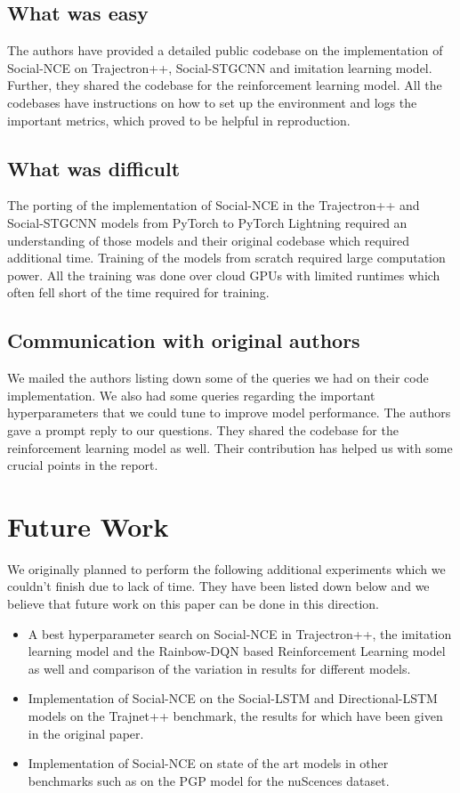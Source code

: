 \subsection{What was easy}
The authors have provided a detailed public codebase on the implementation of Social-NCE on Trajectron++, Social-STGCNN and imitation learning model. Further, they shared the codebase for the reinforcement learning model. All the codebases have instructions on how to set up the environment and logs the important metrics, which proved to be helpful in reproduction. 

\subsection{What was difficult}
The porting of the implementation of Social-NCE in the Trajectron++ and Social-STGCNN models from PyTorch to PyTorch Lightning required an understanding of those models and their original codebase which required additional time. Training of the models from scratch required large computation power. All the training was done over cloud GPUs with limited runtimes which often fell short of the time required for training.

\subsection{Communication with original authors}
We mailed the authors listing down some of the queries we had on their code implementation. We also had some queries regarding the important hyperparameters that we could tune to improve model performance. The authors gave a prompt reply to our questions. They shared the codebase for the reinforcement learning model as well. Their contribution has helped us with some crucial points in the report. 

\section{Future Work}
We originally planned to perform the following additional experiments which we couldn't finish due to lack of time. They have been listed down below and we believe that future work on this paper can be done in this direction.
\begin{itemize}
    \item A best hyperparameter search on Social-NCE in Trajectron++, the imitation learning model and the Rainbow-DQN based Reinforcement Learning model as well and comparison of the variation in results for different models.
    \item Implementation of Social-NCE on the Social-LSTM and Directional-LSTM models on the Trajnet++ benchmark, the results for which have been given in the original paper.
    \item Implementation of Social-NCE on state of the art models in other benchmarks such as on the PGP model \cite {deo2021multimodal} for the nuScences dataset.
\end{itemize}